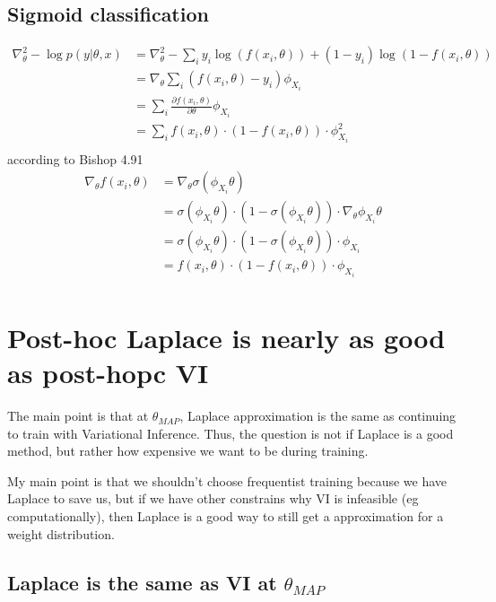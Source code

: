 \documentclass[a4paper]{scrartcl}
\begin{document}
  \subsection{Sigmoid classification}
    \begin{align}
      \nabla^2_\theta -\log p(y \vert \theta, x) 
      &= \nabla^2_\theta - \sum_i y_i \log(f(x_i, \theta)) + (1 - y_i) \log(1-f(x_i, \theta))\\
      &= \nabla_\theta \sum_i (f(x_i, \theta)- y_i) \phi_{X_i}\\
      &= \sum_i \frac{\partial f(x_i, \theta)}{ \partial \theta} \phi_{X_i}\\
      &= \sum_i f(x_i, \theta) \cdot (1 - f(x_i, \theta)) \cdot \phi_{X_i}^2\\
    \end{align}
    according to Bishop 4.91
    \begin{align}
      \nabla_\theta f(x_i, \theta) 
      &= \nabla_\theta \sigma(\phi_{X_i} \theta)\\
      &= \sigma(\phi_{X_i} \theta) \cdot (1 - \sigma(\phi_{X_i} \theta)) \cdot \nabla_\theta \phi_{X_i} \theta \\
      &= \sigma(\phi_{X_i} \theta) \cdot (1 - \sigma(\phi_{X_i} \theta)) \cdot \phi_{X_i}\\
      &= f(x_i, \theta) \cdot (1 - f(x_i, \theta)) \cdot \phi_{X_i}\\
    \end{align}





\section{Post-hoc Laplace is nearly as good as post-hopc VI}
The main point is that at $\theta_{MAP}$, Laplace approximation is the same
as continuing to train with Variational Inference. Thus, the question is not
if Laplace is a good method, but rather how expensive we want to be during
training.

My main point is that we shouldn't choose frequentist training because we
have Laplace to save us, but if we have other constrains why VI is
infeasible (eg computationally), then Laplace is a good way to still get a
approximation for a weight distribution.

\subsection{Laplace is the same as VI at $\theta_{MAP}$}
\end{document}
